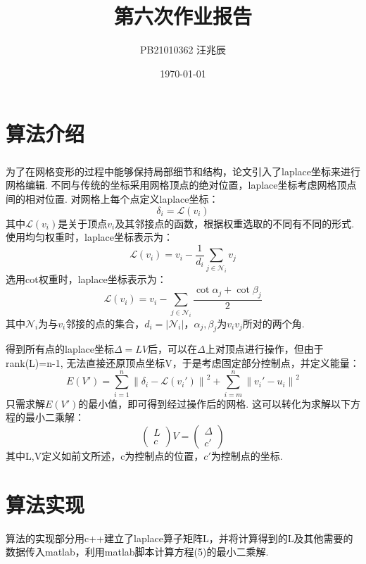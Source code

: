 \documentclass[12pt]{article}
\title{第六次作业报告}
\author{PB21010362 汪兆辰}
\date{\today}
\newcommand{\upcite}[1]{\textsuperscript{\textsuperscript{\cite{#1}}}}
\begin{document}
\maketitle

\section{算法介绍}
为了在网格变形的过程中能够保持局部细节和结构，论文\upcite{1}引入了laplace坐标来进行网格编辑. 不同与传统的坐标采用网格顶点的绝对位置，laplace坐标考虑网格顶点间的相对位置.
对网格上每个点定义laplace坐标：
\begin{equation}
    \delta _i=\mathcal{L} (v_i)
\end{equation}
其中$\mathcal{L} (v_i)$是关于顶点$v_i$及其邻接点的函数，根据权重选取的不同有不同的形式. 使用均匀权重时，laplace坐标表示为：
\begin{equation}
    \mathcal{L} (v_i)=v_i-\frac{1}{d_i} \sum_{j \in \mathcal{N} _i} v_j
\end{equation}
选用cot权重时，laplace坐标表示为：
\begin{equation}
    \mathcal{L} (v_i)=v_i-\sum_{j \in \mathcal{N}_i} \frac{\cot \alpha _j +\cot \beta _j}{2}
\end{equation}
其中$\mathcal{N}_i$为与$v_i$邻接的点的集合，$d_i=|\mathcal{N}_i|$，$\alpha_j,\beta_j$为$v_i v_j$所对的两个角.

得到所有点的laplace坐标$\Delta=LV$后，可以在$\Delta$上对顶点进行操作，但由于rank(L)=n-1, 无法直接还原顶点坐标V，于是考虑固定部分控制点，并定义能量：
\begin{equation}
    E(V')=\sum_{i=1}^{n} \left\lVert \delta_i -\mathcal{L}(v_i')\right\rVert ^2+\sum_{i=m}^{n}\left\lVert v_i'-u_i\right\rVert ^2  
\end{equation}
只需求解$E(V')$的最小值，即可得到经过操作后的网格. 这可以转化为求解以下方程的最小二乘解：
\begin{equation}
    \begin{pmatrix}
        L\\
        c
    \end{pmatrix}
    V=
    \begin{pmatrix}
        \Delta \\
        c'
    \end{pmatrix}
\end{equation}
其中L,V定义如前文所述，c为控制点的位置，$c'$为控制点的坐标.

\section{算法实现}
算法的实现部分用c++建立了laplace算子矩阵L，并将计算得到的L及其他需要的数据传入matlab，利用matlab脚本计算方程(5)的最小二乘解.
\end{document}
